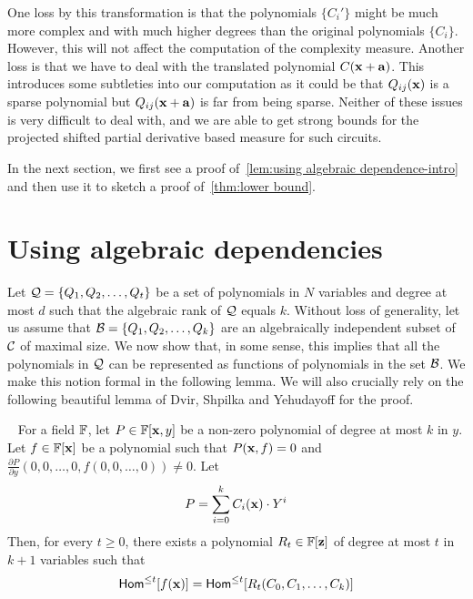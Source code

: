 One loss by this transformation is that the polynomials $\{C_i'\}$ might be much more complex and with much higher degrees than the original polynomials $\{C_i\}$. However, this will not affect the computation of the complexity measure. Another loss is that we have to deal with the translated polynomial $C(\mathbf{x} + \mathbf{a})$. This introduces some subtleties into our computation as it could be that $Q_{ij}(\mathbf{x})$ is a sparse polynomial but $Q_{ij}(\mathbf{x}+ \mathbf{a})$ is far from being sparse. Neither of these issues is very difficult to deal with, and we are able to get strong bounds for the projected shifted partial derivative based measure for such circuits. 

In the next section, we first see a proof of~\autoref{lem:using algebraic dependence-intro} and then use it to sketch a proof of~\autoref{thm:lower bound}. 

\section{Using algebraic dependencies}
Let ${\cal Q} = \{Q_1, Q_2, \ldots, Q_t\}$ be a set of polynomials in $N$ variables and degree at most $d$ such that the algebraic rank of ${\cal Q}$ equals $k$. Without loss of generality, let us assume that ${\cal B} = \{Q_1, Q_2, \ldots, Q_k\}$ are an algebraically independent subset of $\cal C$ of maximal size. We now show that, in some sense, this implies that all the polynomials in ${\cal Q}$ can be represented as functions of  polynomials in the set ${\cal B}$. We make this notion formal in the following lemma. We will also crucially rely on the following beautiful lemma of Dvir, Shpilka and Yehudayoff for the proof. 

\begin{lemma}~\label{lem:DSY main}
For a field $\mathbb{F}$, let $P \in \mathbb{F}[\mathbf{x}, y]$ be a non-zero polynomial of degree at most $k$ in $y$. Let $f \in \mathbb{F}[\mathbf{x}]$ be a polynomial such that $P(\mathbf{x}, f) = 0$ and $\frac{\partial P}{\partial y} (0, 0, \ldots, 0, f(0, 0, \ldots, 0))\neq 0$. Let $$P = \sum_{i = 0}^k C_i(\mathbf{x})\cdot Y^i$$ Then, for every $t \geq 0$, there exists a polynomial $R_t \in \mathbb{F}[\mathbf{z}]$ of degree at most $t$ in $k+1$ variables such that $$\mathsf{Hom}^{\leq t}[f(\mathbf{x})] = \mathsf{Hom}^{\leq t}[R_t(C_0, C_1, \ldots, C_k)] $$
\end{lemma} 



